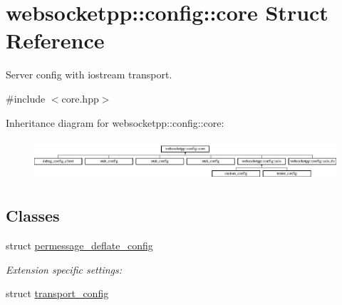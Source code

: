 \hypertarget{structwebsocketpp_1_1config_1_1core}{}\section{websocketpp\+:\+:config\+:\+:core Struct Reference}
\label{structwebsocketpp_1_1config_1_1core}


Server config with iostream transport.  




{\ttfamily \#include $<$core.\+hpp$>$}

Inheritance diagram for websocketpp\+:\+:config\+:\+:core\+:\begin{figure}[H]
\begin{center}
\leavevmode
\includegraphics[height=1.538462cm]{structwebsocketpp_1_1config_1_1core}
\end{center}
\end{figure}
\subsection*{Classes}
\begin{DoxyCompactItemize}
\item 
struct \hyperlink{structwebsocketpp_1_1config_1_1core_1_1permessage__deflate__config}{permessage\+\_\+deflate\+\_\+config}
\begin{DoxyCompactList}\small\item\em Extension specific settings\+: \end{DoxyCompactList}\item 
struct \hyperlink{structwebsocketpp_1_1config_1_1core_1_1transport__config}{transport\+\_\+config}
\end{DoxyCompactItemize}
